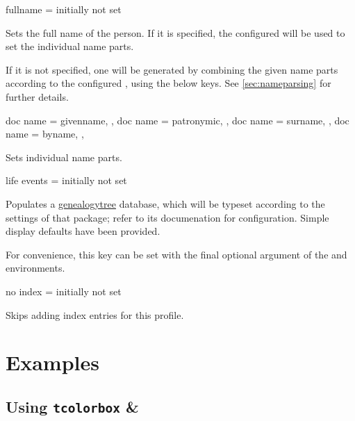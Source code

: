 \documentclass[
	a4paper,
]{article}
\begin{document}
\begin{docKey}
	{fullname}
	{=}
	{initially not set}

	Sets the full name of the person. If it is specified, the configured  will be used to set the individual name parts.

	If it is not specified, one will be generated by combining the given name parts according to the configured , using the below keys. See \cref{sec:nameparsing} for further details.
\end{docKey}

\begin{docKeys}
	[
		doc parameter = {=\meta{...}},
		doc description = {initially not set},
	]
	{
		{
			doc name = givenname,
		},
		{
			doc name = patronymic,
		},
		{
			doc name = surname,
		},
		{
			doc name = byname,
		},
	}

	Sets individual name parts.

\end{docKeys}

\begin{docKey}
	{life events}
	{=}
	{initially not set}

	Populates a \href{https://ctan.org/pkg/genealogytree}{genealogytree} database, which will be typeset according to the settings of that package; refer to its documenation for configuration. Simple display defaults have been provided.

	For convenience, this key can be set with the final optional argument of the  and  environments.
\end{docKey}

\begin{docKey}
	{no index}
	{=}
	{initially not set}

	Skips adding index entries for this profile.
\end{docKey}

\clearpage
\section{Examples} %

\label{sec:examples}

\subsection{Using \texttt{tcolorbox} \& }
\end{document}
